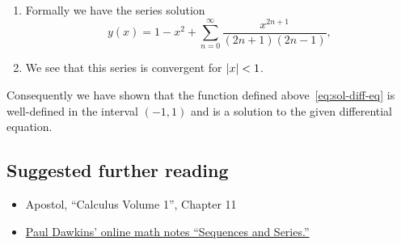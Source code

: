 \begin{solution}
\begin{enumerate}
    \item Formally we have the series solution
          \begin{equation}
            \label{eq:sol-diff-eq}
            y(x) = 1 - x^2 + \sum_{n=0}^{\infty} \frac{x^{2n+1}}{(2n+1)(2n-1)},
          \end{equation}
    \item We see that this series is convergent for \(\left|x\right|<1\).
  \end{enumerate}
  Consequently we have shown that the function defined above~\eqref{eq:sol-diff-eq} is well-defined in the interval \((-1,1)\) and is a solution to the given differential equation.
\end{solution}



\subsection*{Suggested further reading}

\begin{itemize}
  \item Apostol, ``Calculus Volume 1'', Chapter 11
  \item \href{https://tutorial.math.lamar.edu/Classes/CalcII/SeriesIntro.aspx}{Paul Dawkins' online math notes ``Sequences and Series.''}
\end{itemize}














